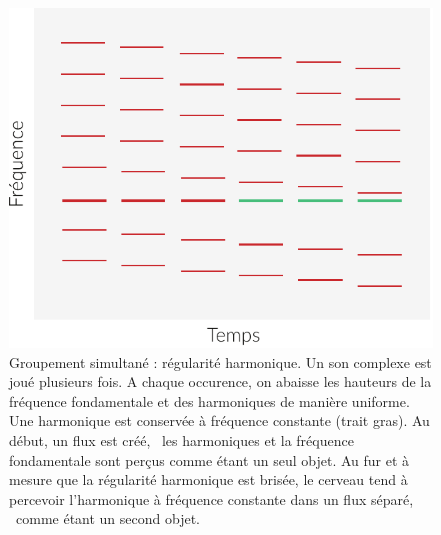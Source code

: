 \begin{figure}[bth]
        \myfloatalign
        \includegraphics[width=.5\linewidth]{gfx/harmo-eps-converted-to}
        \caption[Groupement simultané : régularité harmonique]{Groupement simultané : régularité harmonique. Un son complexe est joué plusieurs fois. A chaque occurence, on abaisse les hauteurs de la fréquence fondamentale et des harmoniques de manière uniforme. Une harmonique est conservée à fréquence constante (trait gras). Au début, un flux est créé, \ie~les harmoniques et la fréquence fondamentale sont perçus comme étant un seul objet. Au fur et à mesure que la régularité harmonique est brisée, le cerveau tend à percevoir l'harmonique à fréquence constante dans un flux séparé, \ie~comme étant un second objet.}\label{fig:harmo}
\end{figure}

